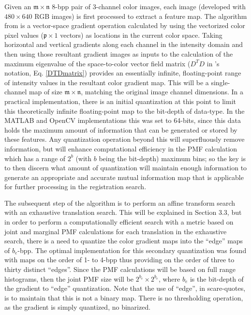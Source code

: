 Given an $\mathfrak{m}\times\mathfrak{n}$ 8-bpp pair of 3-channel color images, each  image (developed with $480\times640$ RGB images) is first processed to extract a feature map. The algorithm from \cite{Lee1991} is a vector-space gradient operation calculated by using the vectorized color pixel values ($\mathfrak{p}\times1$ vectors) as locations in the current color space. Taking horizontal and vertical gradients along each channel in the intensity domain and then using those resultant gradient images as inputs to the calculation of the maximum eigenvalue of the space-to-color vector field matrix ($D^{T}D$ in \cite{Lee1991}'s notation, Eq. \ref{DTDmatrix}) provides an essentially infinite, floating-point range of intensity values in the resultant color gradient map. This will be a single-channel map of size $\mathfrak{m}\times\mathfrak{n}$, matching the original image channel dimensions. In a practical implementation, there is an initial quantization at this point to limit this theoretically infinite floating-point map to the bit-depth of data-type. In the MATLAB\textsuperscript{\textregistered} and OpenCV implementations this was set to 64-bits, since this data holds the maximum amount of information that can be generated or stored by these features. Any quantization operation beyond this will superfluously remove information, but will enhance computational efficiency in the PMF calculation which has a range of $2^{b}$ (with $b$ being the bit-depth) maximum bins; so the key is to then discern what amount of quantization will maintain enough information to generate an appropriate and accurate mutual information map that is applicable for further processing in the registration search.

The subsequent step of the algorithm is to perform an affine transform search with an exhaustive translation search. This will be explained in Section 3.3, but in order to perform a computationally efficient search with a metric based on joint and marginal PMF calculations for each translation in the exhaustive search, there is a need to quantize the color gradient maps into the ``edge'' maps of $b_{e}$-bpp. The optimal implementation for this secondary quantization was found with maps on the order of 1- to 4-bpp thus providing on the order of three to thirty distinct ``edges''. Since the PMF calculations will be based on full range histograms, then the joint PMF size will be $2^{b_{e}} \times 2^{b_{e}}$, where $b_{e}$ is the bit-depth of the gradient to ``edge'' quantization. Note that the use of ``edge'', in scare-quotes, is to maintain that this is not a binary map. There is no thresholding operation, as the gradient is simply quantized, no binarized.

